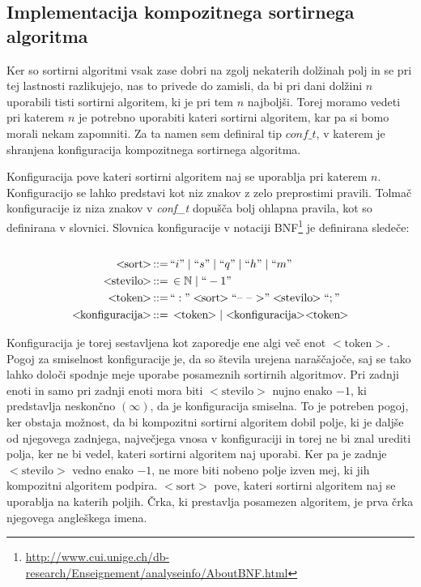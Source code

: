 \documentclass[a4paper,oneside]{article}
\def\N{\mathbb N}
\def\ali{\;|\;}
\newenvironment{BNF}{
    \\
    \Sbox
    \minipage{12cm}
}{
    \endminipage
    \endSbox
    \minipage{\textwidth}
    \vspace*{5pt}
    \begin{center}
        \fcolorbox{white}{white}{
            \TheSbox
        }
    \end{center}
    \vspace*{5pt}
    \endminipage
}
\def\bnfassign:{\,::=&\,}
\newcommand{\q}[1]{\text{``}#1\text{''}}
\newcommand{\ntm}[1]{\ensuremath{<\!\!\text{#1}\!\!>}}
\newcommand{\abnf}[2]{\ensuremath{\ntm{#1} \bnfassign: #2}}
\begin{document}
\subsection{Implementacija kompozitnega sortirnega algoritma}
\label{chapter:tweaksort}
Ker so sortirni algoritmi vsak zase dobri na zgolj nekaterih dolžinah polj in se pri tej
lastnosti razlikujejo, nas to privede do zamisli, da bi pri dani dolžini $n$ uporabili tisti
sortirni algoritem, ki je pri tem $n$ najboljši. Torej moramo vedeti pri katerem $n$ je
potrebno uporabiti kateri sortirni algoritem, kar pa si bomo morali nekam zapomniti. Za ta
namen sem definiral tip $conf\_t$, v katerem je shranjena konfiguracija kompozitnega
sortirnega algoritma. 

Konfiguracija pove kateri sortirni algoritem naj se uporablja pri
katerem $n$. Konfiguracijo se lahko predstavi kot niz znakov z zelo preprostimi
pravili. Tolmač konfiguracije iz niza znakov v \emph{conf\_t} dopušča bolj ohlapna pravila, kot so
definirana v slovnici. Slovnica konfiguracije v notaciji
BNF\footnote{\url{http://www.cui.unige.ch/db-research/Enseignement/analyseinfo/AboutBNF.html}} 
je definirana sledeče:
\\
\begin{BNF} %
  \begin{align*}
    \abnf{sort}{\q{i} \ali \q{s} \ali \q{q} \ali \q{h} \ali \q{m}}\\
    \abnf{stevilo}{\in \N \ali \q{-1}} \\
    \abnf{token}{\q{:}\ntm{sort}\q{\mbox{--}\ \mbox{--}\ \mbox{$>$}}\ntm{stevilo}\q{;}}\\
    \abnf{konfiguracija}{\ntm{token} | \ntm{konfiguracija}\ntm{token}}
  \end{align*}
\end{BNF}

Konfiguracija je torej sestavljena kot zaporedje ene algi več enot \ntm{token}.
Pogoj za smiselnost konfiguracije je, da so števila urejena naraščajoče, saj se tako lahko
določi spodnje meje uporabe posameznih sortirnih algoritmov.
Pri zadnji enoti in samo pri zadnji enoti mora biti \ntm{stevilo} nujno enako $-1$, ki predstavlja
neskončno $(\infty)$, da je konfiguracija smiselna. To je potreben pogoj, ker obstaja možnost, da bi
kompozitni sortirni algoritem dobil polje, ki je daljše od njegovega zadnjega, največjega
vnosa v konfiguraciji in torej ne bi znal urediti polja, ker ne bi vedel, kateri sortirni
algoritem naj uporabi. Ker pa je zadnje \ntm{stevilo} vedno enako $-1$, ne more biti nobeno
polje izven mej, ki jih kompozitni algoritem podpira.
\ntm{sort} pove, kateri sortirni algoritem naj se uporablja na katerih poljih. Črka, ki
prestavlja posamezen algoritem, je prva črka njegovega angleškega imena.
\end{document}
